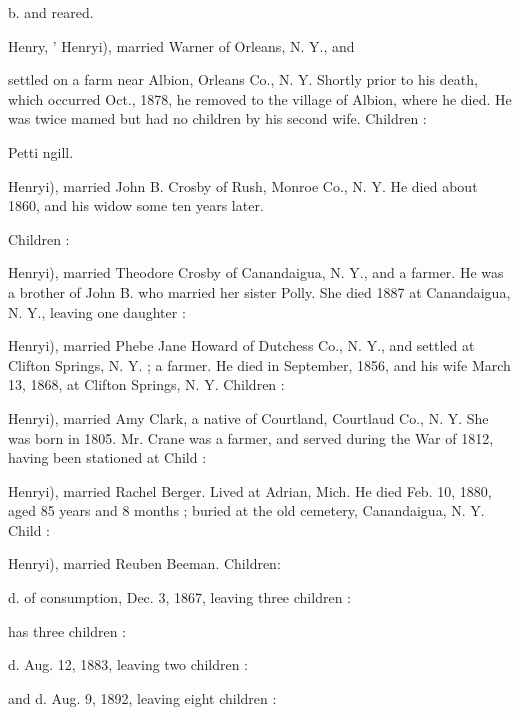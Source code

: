 \documentclass[oneside]{book}
\begin{document}
b. and reared. 


Henry, ' Henryi), married Warner of Orleans, N. Y., and 

settled on a farm near Albion, Orleans Co., N. Y. Shortly prior 
to his death, which occurred Oct., 1878, he removed to the 
village of Albion, where he died. He was twice mamed but had 
no children by his second wife. Children : 



Petti ngill. 

Henryi), married John B. Crosby of Rush, Monroe Co., N. Y. 
He died about 1860, and his widow some ten years later. 

Children : 




Henryi), married Theodore Crosby of Canandaigua, N. Y., and 
a farmer. He was a brother of John B. who married her sister 
Polly. She died 1887 at Canandaigua, N. Y., leaving one 
daughter : 


Henryi), married Phebe Jane Howard of Dutchess Co., N. Y., 
and settled at Clifton Springs, N. Y. ; a farmer. He died in 
September, 1856, and his wife March 13, 1868, at Clifton Springs, 
N. Y. Children : 





Henryi), married Amy Clark, a native of Courtland, Courtlaud 
Co., N. Y. She was born in 1805. Mr. Crane was a farmer, 
and served during the War of 1812, having been stationed at 
Child : 


Henryi), married Rachel Berger. Lived at Adrian, Mich. He 
died Feb. 10, 1880, aged 85 years and 8 months ; buried at the 
old cemetery, Canandaigua, N. Y. Child : 


Henryi), married Reuben Beeman. Children: 


d. of consumption, Dec. 3, 1867, leaving three children : 





has three children : 





d. Aug. 12, 1883, leaving two children : 




and d. Aug. 9, 1892, leaving eight children : 
\end{document}
